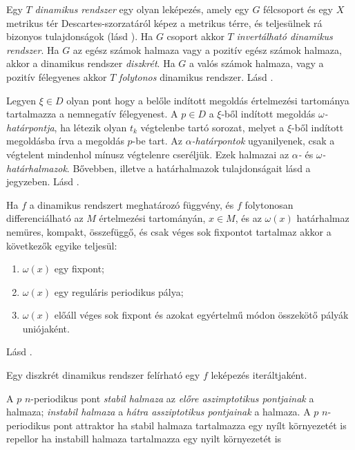 \documentclass[DIV=15,appendixprefix]{scrreprt}
\theoremstyle{definition}
\theoremstyle{remark}
\begin{document}
Egy $ T $ \emph{dinamikus rendszer} egy olyan leképezés, amely egy $ G $ félcsoport és egy $ X $
metrikus tér Descartes-szorzatáról képez a metrikus térre, és teljesülnek rá bizonyos tulajdonságok
(lásd \cite[18.~oldal]{Makay}). Ha $ G $ csoport akkor $ T $ \emph{invertálható dinamikus rendszer}.
Ha $ G $ az egész számok halmaza vagy a pozitív egész számok halmaza, akkor a dinamikus rendszer
\emph{diszkrét}. Ha $ G $ a valós számok halmaza, vagy a pozitív félegyenes akkor $ T $
\emph{folytonos} dinamikus rendszer.
%
Lásd \cite[4.~oldal]{Makay}.

Legyen $ \xi \in D $ olyan pont hogy a belőle indított megoldás értelmezési tartománya tartalmazza
a nemnegatív félegyenest. A $ p \in D $ a $ \xi $-ből indított megoldás
\emph{$\omega$-határpontja}, ha létezik olyan $ t_k $ végtelenbe tartó sorozat, melyet a $ \xi$-ből
indított megoldásba írva a megoldás $ p $-be tart. Az \emph{$\alpha$-határpontok} ugyanilyenek, csak
a végtelent mindenhol mínusz végtelenre cseréljük. Ezek halmazai az \emph{$\alpha$-} és
\emph{$\omega$-határhalmazok}. Bővebben, illetve a határhalmazok tulajdonságait lásd a jegyzeben.
%
Lásd \cite[40.~oldal]{Makay}.

Ha $ f $ a dinamikus rendszert meghatározó függvény, és $f$ folytonosan differenciálható az $M$
értelmezési tartományán, $ x\in M $, és az $\omega \left( x \right) $ határhalmaz
nemüres, kompakt, összefüggő, és csak véges sok fixpontot tartalmaz akkor a következők egyike
teljesül:
\begin{enumerate}
	\item $\omega \left( x \right) $ egy fixpont;
	\item $\omega \left( x \right) $ egy reguláris periodikus pálya;
	\item $\omega \left( x \right) $ előáll véges sok fixpont és azokat egyértelmű módon összekötő
		pályák uniójaként.
\end{enumerate}
%
Lásd \cite[18--21.~oldal]{Makay}.

Egy diszkrét dinamikus rendszer felírható egy $ f $ leképezés iteráltjaként.

A $p$ $n$-periodikus pont \emph{stabil halmaza} az \emph{előre aszimptotikus pontjainak} a halmaza;
\emph{instabil halmaza} a \emph{hátra assziptotikus pontjainak} a halmaza. A $ p $ $n$-periodikus
pont attraktor ha stabil halmaza tartalmazza egy nyílt környezetét is
repellor ha instabill halmaza tartalmazza egy nyilt környezetét is
\end{document}
